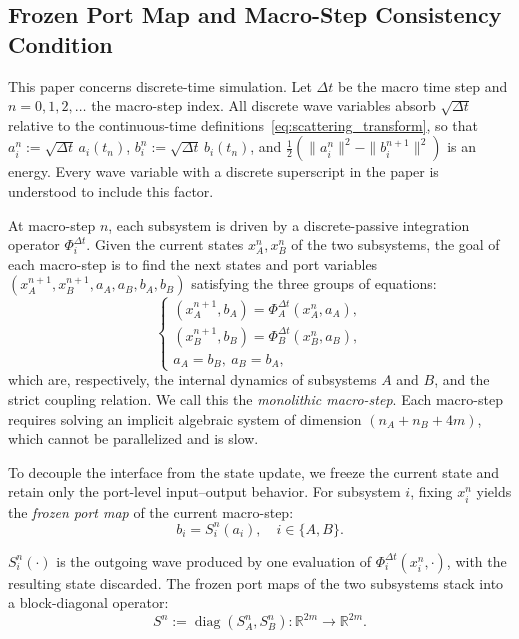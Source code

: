 \subsection{Frozen Port Map and Macro-Step Consistency Condition}
\label{subsec:frozen_port_map}

This paper concerns discrete-time simulation. Let $\Delta t$ be the macro time step and $n = 0, 1, 2, \dots$ the macro-step index. All discrete wave variables absorb $\sqrt{\Delta t}$ relative to the continuous-time definitions~\eqref{eq:scattering_transform}, so that $a_i^n := \sqrt{\Delta t}\, a_i(t_n)$, $b_i^n := \sqrt{\Delta t}\, b_i(t_n)$, and $\frac{1}{2}(\|a_i^n\|^2 - \|b_i^{n+1}\|^2)$ is an energy. Every wave variable with a discrete superscript in the paper is understood to include this factor.

At macro-step $n$, each subsystem is driven by a discrete-passive integration operator $\Phi^{\Delta t}_i$. Given the current states $x_A^n, x_B^n$ of the two subsystems, the goal of each macro-step is to find the next states and port variables $(x_A^{n+1}, x_B^{n+1}, a_A, a_B, b_A, b_B)$ satisfying the three groups of equations:
\begin{equation}
\begin{cases}
(x_A^{n+1},b_A) = \Phi^{\Delta t}_A(x_A^n,a_A),\\[2pt]
(x_B^{n+1},b_B) = \Phi^{\Delta t}_B(x_B^n,a_B),\\[2pt]
a_A = b_B, \ a_B = b_A,
\end{cases}
\label{eq:monolithic_macro_step}
\end{equation}
which are, respectively, the internal dynamics of subsystems $A$ and $B$, and the strict coupling relation. We call this the \emph{monolithic macro-step}. Each macro-step requires solving an implicit algebraic system of dimension $(n_A+n_B+4m)$, which cannot be parallelized and is slow.

To decouple the interface from the state update, we freeze the current state and retain only the port-level input--output behavior. For subsystem $i$, fixing $x_i^n$ yields the \emph{frozen port map} of the current macro-step:
\begin{equation}
b_i = S_i^n(a_i), \quad i \in \{A, B\}.
\label{eq:frozen_port_map}
\end{equation}

$S_i^n(\cdot)$ is the outgoing wave produced by one evaluation of $\Phi_i^{\Delta t}(x_i^n, \cdot)$, with the resulting state discarded. The frozen port maps of the two subsystems stack into a block-diagonal operator:
\begin{equation}
S^n := \operatorname{diag}(S_A^n, S_B^n): \mathbb{R}^{2m} \to \mathbb{R}^{2m}.
\label{eq:stacked_frozen_map}
\end{equation}

